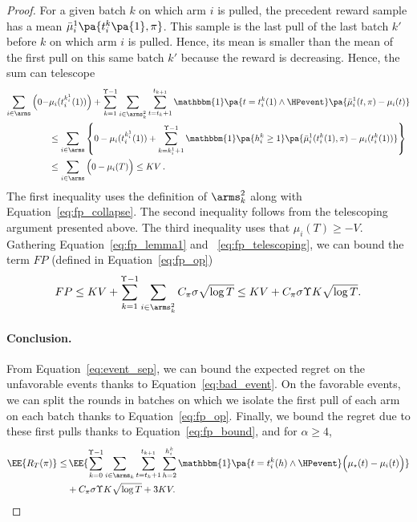 \begin{proof}
For a given batch $k$ on which arm $i$ is pulled, the precedent reward sample has a mean $\bar{\mu}_i^1\pa{t_i^k\pa{1}, \pi}$. This sample is the last pull of the last batch $k'$ before $k$ on which arm $i$ is pulled. Hence, its mean is smaller than the mean of the first pull on this same batch $k'$ because the reward is decreasing. Hence, the sum can telescope
\begin{align}
\label{eq:fp_telescoping} 
\sum_{i \in \arms} \Big(0 -& \mu_i(t_i^{k_i^1}(1))\Big) + \sum_{k=1}^{\Upsilon -1}  \sum_{i\in \arms_k^2} \sum_{t=t_k +1 }^{t_{k+1}}\mathbbm{1}\pa{ t = t_i^k(1) \land \HPevent}\pa{ \bar{\mu}^1_i(t,\pi) - \mu_{i}(t)} \nonumber\\
& \leq \sum_{i \in \arms}\left\{ 0- \mu_i(t_i^{k_i^1}(1)) + \sum_{k=k_i^1 + 1}^{\Upsilon-1 } \mathbbm{1}\pa{h^k_{i} \geq 1  }\pa{\bar{\mu}^1_i(t_i^k(1), \pi) - \mu_{i}(t_i^k(1))} \right\} \nonumber\\
& \leq \sum_{i \in \arms} \Big(0-\mu_i(T)\Big) \leq KV\,.  
\end{align}
The first inequality uses the definition of $\arms_k^2$ along with Equation~\ref{eq:fp_collapse}. The second inequality follows from the telescoping argument presented above. The third inequality uses that $\mu_i(T) \geq -V$. Gathering Equation~\ref{eq:fp_lemma1} and  ~\ref{eq:fp_telescoping}, we can bound the term $FP$ (defined in Equation~\ref{eq:fp_op}) 
\begin{equation}
\label{eq:fp_bound}
FP \leq  KV + \sum_{k=1}^{\Upsilon - 1} \sum_{i\in \arms_k^2} C_\pi \sigma \sqrt{\log{T}} \leq KV + C_\pi \sigma \Upsilon K\sqrt{\log{T}} .    
\end{equation}



\paragraph{Conclusion.} From Equation~\ref{eq:event_sep}, we can bound the expected regret on the unfavorable events thanks to Equation~\ref{eq:bad_event}. On the favorable events, we can split the rounds in batches on which we isolate the first pull of each arm on each batch thanks to Equation~\ref{eq:fp_op}. Finally, we bound the regret due to these first pulls thanks to Equation~\ref{eq:fp_bound}, and for $\alpha \geq 4$,
\begin{align*}
\EE{R_T(\pi)} \leq &  \, \EE{\sum_{k=0}^{\Upsilon-1} \sum_{i\in\arms_k}\sum_{t=t_k +1 }^{t_{k+1}}\sum_{h=2}^{h^k_{i}}\mathbbm{1}\pa{ t = t_i^k(h) \land \HPevent} \Big( \mu_{\star}(t) - \mu_{i}(t)\Big)} \\
&+  C_\pi \sigma \Upsilon K \sqrt{\log{T}} + 3KV.
\end{align*}


\end{proof}
